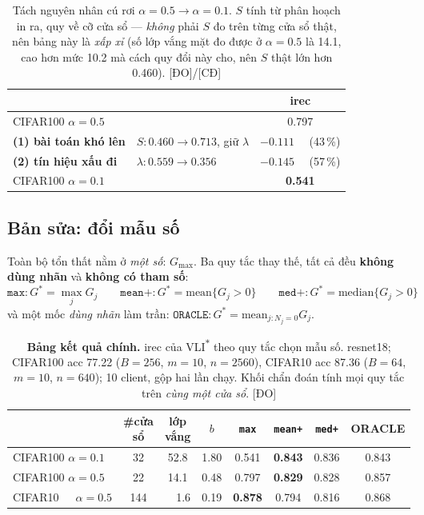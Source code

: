 \documentclass[11pt,a4paper]{article}
\theoremstyle{remark}
\newcommand{\DO}{\textsf{[ĐO]}}
\newcommand{\CD}{\textsf{[CĐ]}}
\begin{document}
\begin{table}[htbp]
\centering
\caption{Tách nguyên nhân cú rơi $\alpha{=}0.5\to\alpha{=}0.1$. $S$ tính từ phân
hoạch in ra, quy về cỡ cửa sổ --- \emph{không} phải $S$ đo trên từng cửa sổ
thật, nên bảng này là \emph{xấp xỉ} (số lớp vắng mặt đo được ở $\alpha{=}0.5$
là 14.1, cao hơn mức 10.2 mà cách quy đổi này cho, nên $S$ thật lớn hơn 0.460).
\DO/\CD}
\label{tab:tach}
\small
\begin{tabular}{@{}llc@{}}
\toprule
 & & irec \\
\midrule
CIFAR100 $\alpha=0.5$ & & 0.797 \\
\quad \textbf{(1) bài toán khó lên} & $S:0.460\to0.713$, giữ $\lambda$ & $-0.111$ \ \ (43\,\%) \\
\quad \textbf{(2) tín hiệu xấu đi} & $\lambda:0.559\to0.356$ & $-0.145$ \ \ (57\,\%) \\
CIFAR100 $\alpha=0.1$ & & \textbf{0.541} \\
\bottomrule
\end{tabular}
\end{table}

\subsection{Bản sửa: đổi mẫu số}

Toàn bộ tổn thất nằm ở \emph{một số}: $G_{\max}$. Ba quy tắc thay thế, tất cả
đều \textbf{không dùng nhãn} và \textbf{không có tham số}:
\[
  \texttt{max}: G^*=\max_j G_j
  \qquad
  \texttt{mean+}: G^*=\mathrm{mean}\{G_j>0\}
  \qquad
  \texttt{med+}: G^*=\mathrm{median}\{G_j>0\}
\]
và một mốc \emph{dùng nhãn} làm trần: $\texttt{ORACLE}: G^*=\mathrm{mean}_{j:N_j=0}G_j$.

\begin{table}[htbp]
\centering
\caption{\textbf{Bảng kết quả chính.} irec của VLI\textsuperscript{$*$} theo quy
tắc chọn mẫu số. resnet18; CIFAR100 acc 77.22 ($B{=}256$, $m{=}10$, $n{=}2560$),
CIFAR10 acc 87.36 ($B{=}64$, $m{=}10$, $n{=}640$); 10 client, gộp hai lần chạy.
Khối chẩn đoán tính mọi quy tắc trên \emph{cùng một cửa sổ}. \DO}
\label{tab:chinh}
\small
\begin{tabular}{@{}lccccccc@{}}
\toprule
 & \#cửa sổ & lớp vắng & $b$ & \texttt{max} & \texttt{mean+} & \texttt{med+} & ORACLE \\
\midrule
CIFAR100 $\alpha=0.1$ & 32 & 52.8 & 1.80 & 0.541 & \textbf{0.843} & 0.836 & 0.843 \\
CIFAR100 $\alpha=0.5$ & 22 & 14.1 & 0.48 & 0.797 & \textbf{0.829} & 0.828 & 0.857 \\
CIFAR10\ \ \ $\alpha=0.5$ & 144 & \ \ 1.6 & 0.19 & \textbf{0.878} & 0.794 & 0.816 & 0.868 \\
\bottomrule
\end{tabular}
\end{table}
\end{document}

